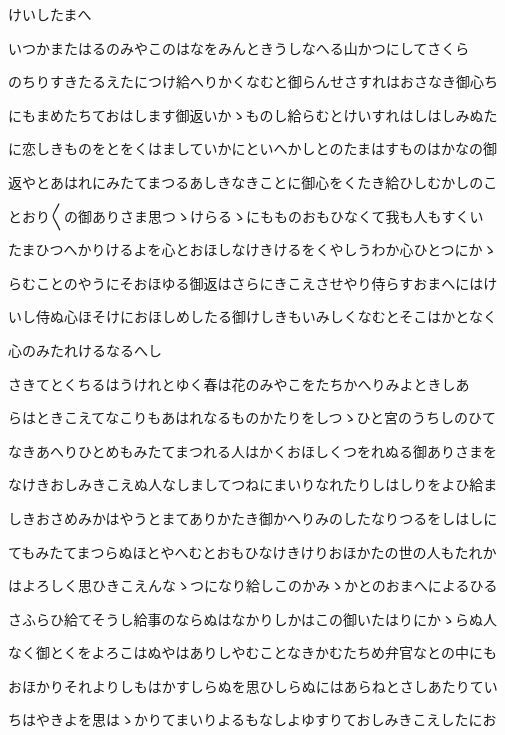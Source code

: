 \documentclass[a4paper,11pt,landscape]{ltjtarticle}
\begin{document}
\par\medskip
けいしたまへ
\par\medskip
いつかまたはるのみやこのはなをみんときうしなへる山かつにしてさくら
\par\medskip
のちりすきたるえたにつけ給へりかくなむと御らんせさすれはおさなき御心ち
\par\medskip
にもまめたちておはします御返いかゝものし給らむとけいすれはしはしみぬた
\par\medskip
に恋しきものをとをくはましていかにといへかしとのたまはすものはかなの御
\par\medskip
返やとあはれにみたてまつるあしきなきことに御心をくたき給ひしむかしのこ
\par\medskip
とおり〱の御ありさま思つゝけらるゝにもものおもひなくて我も人もすくい
\par\medskip
たまひつへかりけるよを心とおほしなけきけるをくやしうわか心ひとつにかゝ
\par\medskip
らむことのやうにそおほゆる御返はさらにきこえさせやり侍らすおまへにはけ
\par\medskip
いし侍ぬ心ほそけにおほしめしたる御けしきもいみしくなむとそこはかとなく
\par\medskip
心のみたれけるなるへし
\par\medskip
さきてとくちるはうけれとゆく春は花のみやこをたちかへりみよときしあ
\par\medskip
らはときこえてなこりもあはれなるものかたりをしつゝひと宮のうちしのひて
\par\medskip
なきあへりひとめもみたてまつれる人はかくおほしくつをれぬる御ありさまを
\par\medskip
なけきおしみきこえぬ人なしましてつねにまいりなれたりしはしりをよひ給ま
\par\medskip
しきおさめみかはやうとまてありかたき御かへりみのしたなりつるをしはしに
\par\medskip
てもみたてまつらぬほとやへむとおもひなけきけりおほかたの世の人もたれか
\par\medskip
はよろしく思ひきこえんなゝつになり給しこのかみゝかとのおまへによるひる
\par\medskip
さふらひ給てそうし給事のならぬはなかりしかはこの御いたはりにかゝらぬ人
\par\medskip
なく御とくをよろこはぬやはありしやむことなきかむたちめ弁官なとの中にも
\par\medskip
おほかりそれよりしもはかすしらぬを思ひしらぬにはあらねとさしあたりてい
\par\medskip
ちはやきよを思はゝかりてまいりよるもなしよゆすりておしみきこえしたにお
\end{document}

